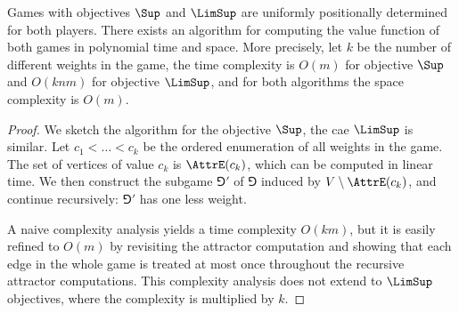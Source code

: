 \begin{theorem}
\label{4-thm:sup-inf-limsup-liminf}
Games with objectives $\Sup$ and $\LimSup$ are uniformly positionally determined for both players.
There exists an algorithm for computing the value function of both games in polynomial time and space.
More precisely, let $k$ be the number of different weights in the game,
the time complexity is $O(m)$ for objective $\Sup$ and $O(knm)$ for objective $\LimSup$,
and for both algorithms the space complexity is $O(m)$.
\end{theorem}

\begin{proof}
We sketch the algorithm for the objective $\Sup$, the cae $\LimSup$ is similar.
Let $c_1 < \dots < c_k$ be the ordered enumeration of all weights in the game.
The set of vertices of value $c_k$ is $\AttrE(c_k)$, which can be computed in linear time.
We then construct the subgame $\Game'$ of $\Game$ induced by $V \setminus \AttrE(c_k)$,
and continue recursively: $\Game'$ has one less weight.

A naive complexity analysis yields a time complexity $O(km)$, but it is easily refined to $O(m)$ 
by revisiting the attractor computation and showing that each edge in the whole game is treated at most once
throughout the recursive attractor computations.
This complexity analysis does not extend to $\LimSup$ objectives, where the complexity is multiplied by $k$.
\end{proof}
